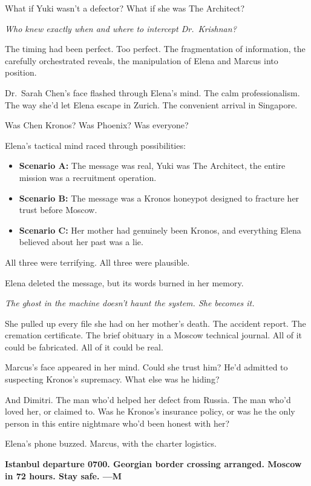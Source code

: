 What if Yuki wasn't a defector? What if she was The Architect?

\emph{Who knew exactly when and where to intercept Dr.~Krishnan?}

The timing had been perfect. Too perfect. The fragmentation of information, the carefully orchestrated reveals, the manipulation of Elena and Marcus into position.

Dr.~Sarah Chen's face flashed through Elena's mind. The calm professionalism. The way she'd let Elena escape in Zurich. The convenient arrival in Singapore.

Was Chen Kronos? Was Phoenix? Was everyone?

Elena's tactical mind raced through possibilities:

\begin{itemize}
\tightlist
\item
  \textbf{Scenario A:} The message was real, Yuki was The Architect, the entire mission was a recruitment operation.
\item
  \textbf{Scenario B:} The message was a Kronos honeypot designed to fracture her trust before Moscow.
\item
  \textbf{Scenario C:} Her mother had genuinely been Kronos, and everything Elena believed about her past was a lie.
\end{itemize}

All three were terrifying. All three were plausible.

Elena deleted the message, but its words burned in her memory.

\emph{The ghost in the machine doesn't haunt the system. She becomes it.}

She pulled up every file she had on her mother's death. The accident report. The cremation certificate. The brief obituary in a Moscow technical journal. All of it could be fabricated. All of it could be real.

Marcus's face appeared in her mind. Could she trust him? He'd admitted to suspecting Kronos's supremacy. What else was he hiding?

And Dimitri. The man who'd helped her defect from Russia. The man who'd loved her, or claimed to. Was he Kronos's insurance policy, or was he the only person in this entire nightmare who'd been honest with her?

Elena's phone buzzed. Marcus, with the charter logistics.

\textbf{Istanbul departure 0700. Georgian border crossing arranged. Moscow in 72 hours. Stay safe. ---M}

